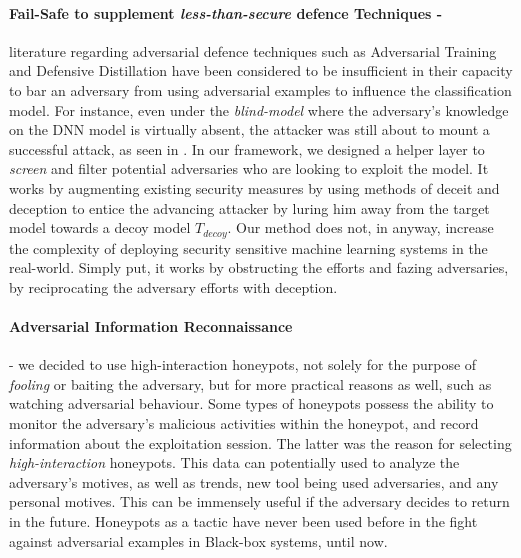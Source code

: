 \documentclass[grad,lot,lof,11pt,oneside,onehalfspace]{RUthesis}
\begin{document}
\paragraph{Fail-Safe to supplement \textit{less-than-secure} defence Techniques -} literature regarding adversarial defence techniques such as Adversarial Training \cite{goodfellow_explaining_2015} and Defensive Distillation \cite{carlini_defensive_nodate} \cite{papernot_distillation_2016} have been considered to be insufficient in their capacity to bar an adversary from using adversarial examples to influence the classification model. For instance, even under the \textit{blind-model} where the adversary's knowledge on the DNN model is virtually absent, the attacker was still about to mount a successful attack, as seen in \cite{hosseini_blocking_2017}. In our framework, we designed a helper layer to \textit{screen} and filter potential adversaries who are looking to exploit the model. It works by augmenting existing security measures by using methods of deceit and deception to  entice the advancing attacker by luring him away from the target model towards a decoy model \textit{$T_{decoy}$}. Our method does not, in anyway, increase the complexity of deploying security sensitive machine learning systems in the real-world. Simply put, it works by obstructing the efforts and fazing adversaries, by reciprocating the adversary efforts with deception.  
\paragraph{Adversarial Information Reconnaissance} - we decided to use high-interaction honeypots, not solely for the purpose of \textit{fooling} or baiting the adversary, but for more practical reasons as well, such as watching adversarial behaviour. Some types of honeypots possess the ability to monitor the adversary's malicious activities within the honeypot, and record information about the exploitation session. The latter was the reason for selecting \textit{high-interaction} honeypots. This data can potentially used to analyze the adversary's motives, as well as trends, new tool being used adversaries, and any personal motives. This can be immensely useful if the adversary decides to return in the future. Honeypots as a tactic have never been used before in the fight against adversarial examples in Black-box systems, until now.     
\end{document}
